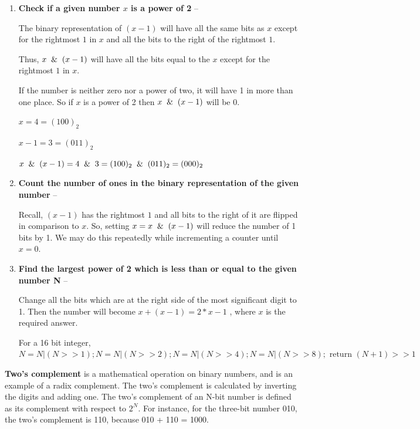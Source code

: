 \documentclass{article}
\begin{document}
    \begin{enumerate}
        \item \textbf{Check if a given number $x$ is a power of 2} --
        
        The binary representation of $(x-1)$ will have all the same bits as $x$ except for the rightmost $1$ in $x$ and all the bits to the right of the rightmost $1$. 
        
        Thus, $x \And (x-1)$ will have all the bits equal to the $x$ except for the rightmost $1$ in $x$.
        
        If the number is neither zero nor a power of two, it will have 1 in more than one place. So if $x$ is a power of 2 then $x \And (x-1)$ will be 0.
         
        $x = 4 = (100)_2$
        
        $x - 1 = 3 = (011)_2$
        
        $x \And (x-1) = 4 \And 3 = (100)_2 \And (011)_2 = (000)_2$
         
         \item \textbf{Count the number of ones in the binary representation of the given number} --
         
         Recall, $(x-1)$ has the rightmost $1$ and all bits to the right of it are flipped in comparison to $x$. So, setting $x = x \And (x-1)$ will reduce the number of 1 bits by 1. We may do this repeatedly while incrementing a counter until $x = 0$.
         
         \item \textbf{Find the largest power of 2 which is less than or equal to the given number N} -- 
         
         Change all the bits which are at the right side of the most significant digit to 1. Then the number will become $x + (x-1) = 2 * x -1$ , where $x$ is the required answer.
         
        For a 16 bit integer,
        $N = N| (N>>1);
        N = N| (N>>2);
        N = N| (N>>4);
        N = N| (N>>8); \text{ return } (N+1)>>1$
         
     \end{enumerate}
    
    \textbf{Two's complement} is a mathematical operation on binary numbers, and is an example of a radix complement. The two's complement is calculated by inverting the digits and adding one. The two's complement of an N-bit number is defined as its complement with respect to $2^N$. For instance, for the three-bit number 010, the two's complement is 110, because 010 + 110 = 1000. 
\end{document}

